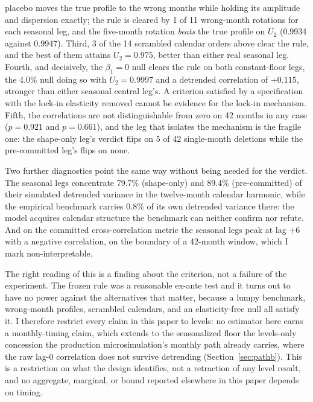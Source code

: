 \documentclass[12pt]{article}
\begin{document}
placebo moves the true profile to the wrong months while holding its amplitude and dispersion exactly; the rule is cleared by 1 of 11 wrong-month rotations for each seasonal leg, and the five-month rotation \emph{beats} the true profile on $U_2$ (0.9934 against 0.9947). Third, 3 of the 14 scrambled calendar orders above clear the rule, and the best of them attains $U_2 = 0.975$, better than either real seasonal leg. Fourth, and decisively, the $\beta_1 = 0$ null clears the rule on both constant-floor legs, the 4.0\% null doing so with $U_2 = 0.9997$ and a detrended correlation of $+0.115$, stronger than either seasonal central leg's. A criterion satisfied by a specification with the lock-in elasticity removed cannot be evidence for the lock-in mechanism. Fifth, the correlations are not distinguishable from zero on 42 months in any case ($p = 0.921$ and $p = 0.661$), and the leg that isolates the mechanism is the fragile one: the shape-only leg's verdict flips on 5 of 42 single-month deletions while the pre-committed leg's flips on none.

Two further diagnostics point the same way without being needed for the verdict. The seasonal legs concentrate 79.7\% (shape-only) and 89.4\% (pre-committed) of their simulated detrended variance in the twelve-month calendar harmonic, while the empirical benchmark carries 0.8\% of its own detrended variance there: the model acquires calendar structure the benchmark can neither confirm nor refute. And on the committed cross-correlation metric the seasonal legs peak at lag $+6$ with a negative correlation, on the boundary of a 42-month window, which I mark non-interpretable.

The right reading of this is a finding about the criterion, not a failure of the experiment. The frozen rule was a reasonable ex-ante test and it turns out to have no power against the alternatives that matter, because a lumpy benchmark, wrong-month profiles, scrambled calendars, and an elasticity-free null all satisfy it. I therefore restrict every claim in this paper to levels: no estimator here earns a monthly-timing claim, which extends to the seasonalized floor the levels-only concession the production microsimulation's monthly path already carries, where the raw lag-0 correlation does not survive detrending (Section~\ref{sec:pathb}). This is a restriction on what the design identifies, not a retraction of any level result, and no aggregate, marginal, or bound reported elsewhere in this paper depends on timing.
\end{document}
